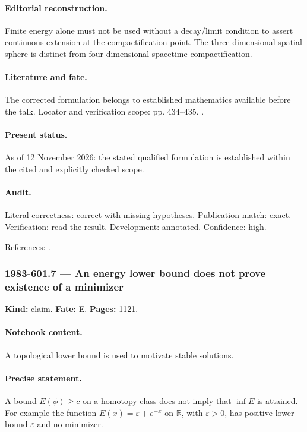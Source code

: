 \paragraph{Editorial reconstruction.} Finite energy alone must not be used without a decay/limit condition to assert continuous extension at the compactification point. The three-dimensional spatial sphere is distinct from four-dimensional spacetime compactification.

\paragraph{Literature and fate.} The corrected formulation belongs to established mathematics available before the talk. Locator and verification scope: pp. 434--435. \cite{witten1983current}.

\paragraph{Present status.} As of 12 November 2026: the stated qualified formulation is established within the cited and explicitly checked scope.

\paragraph{Audit.} Literal correctness: correct with missing hypotheses. Publication match: exact. Verification: read the result. Development: annotated. Confidence: high.

\noindent References: \citep{witten1983current}.\par

\subsubsection{1983-601.7 --- An energy lower bound does not prove existence of a minimizer}

\label{item:1983-601.7}

\noindent\textbf{Kind:} claim. \textbf{Fate:} E. \textbf{Pages:} 1121.\par

\paragraph{Notebook content.} A topological lower bound is used to motivate stable solutions.

\paragraph{Precise statement.} A bound \(E(\phi)\ge c\) on a homotopy class does not imply that \(\inf E\) is attained. For example the function \(E(x)=\varepsilon+e^{-x}\) on \(\mathbb R\), with \(\varepsilon>0\), has positive lower bound \(\varepsilon\) and no minimizer.

